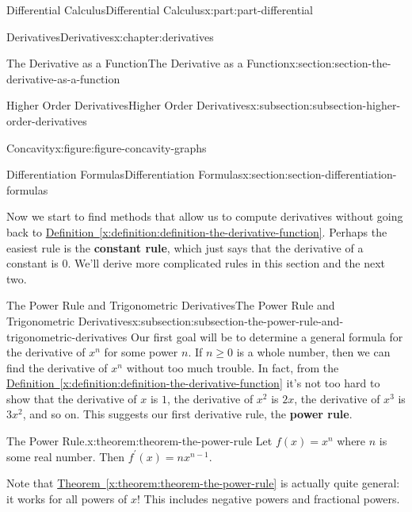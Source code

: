 \documentclass[twoside,10pt,]{book}
\newcommand{\xreffont}{\relax}
\newcommand{\terminology}[1]{\textbf{#1}}
\numberwithin{equation}{part}
\begin{document}
\begin{partptx}{Differential Calculus}{}{Differential Calculus}{}{}{x:part:part-differential}
\begin{chapterptx}{Derivatives}{}{Derivatives}{}{}{x:chapter:derivatives}
\begin{sectionptx}{The Derivative as a Function}{}{The Derivative as a Function}{}{}{x:section:section-the-derivative-as-a-function}
\begin{subsectionptx}{Higher Order Derivatives}{}{Higher Order Derivatives}{}{}{x:subsection:subsection-higher-order-derivatives}
\begin{figureptx}{Concavity}{x:figure:figure-concavity-graphs}{}
\begin{sidebyside}{2}{0}{0}{0}
\begin{sbspanel}{0.5}
\end{sbspanel}%
\end{sidebyside}%
\tcblower
\end{figureptx}%
\end{subsectionptx}
\end{sectionptx}
%
%
\typeout{************************************************}
\typeout{************************************************}
%
\begin{sectionptx}{Differentiation Formulas}{}{Differentiation Formulas}{}{}{x:section:section-differentiation-formulas}
\begin{introduction}{}%
Now we start to find methods that allow us to compute derivatives without going back to \hyperref[x:definition:definition-the-derivative-function]{Definition~{\xreffont\ref{x:definition:definition-the-derivative-function}}}. Perhaps the easiest rule is the \terminology{constant rule}, which just says that the derivative of a constant is \(0\). We'll derive more complicated rules in this section and the next two.%
\end{introduction}%
%
%
\typeout{************************************************}
\typeout{************************************************}
%
\begin{subsectionptx}{The Power Rule and Trigonometric Derivatives}{}{The Power Rule and Trigonometric Derivatives}{}{}{x:subsection:subsection-the-power-rule-and-trigonometric-derivatives}
Our first goal will be to determine a general formula for the derivative of \(x^{n}\) for some power \(n\). If \(n\geq0\) is a whole number, then we can find the derivative of \(x^{n}\) without too much trouble. In fact, from the \hyperref[x:definition:definition-the-derivative-function]{Definition~{\xreffont\ref{x:definition:definition-the-derivative-function}}} it's not too hard to show that the derivative of \(x\) is \(1\), the derivative of \(x^{2}\) is \(2x\), the derivative of \(x^{3}\) is \(3x^{2}\), and so on. This suggests our first derivative rule, the \terminology{power rule}.%
\begin{theorem}{The Power Rule.}{}{x:theorem:theorem-the-power-rule}%
%
Let \(f(x) = x^{n}\) where \(n\) is some real number. Then \(f^{\prime}(x) = nx^{n-1}\).%
\end{theorem}
Note that \hyperref[x:theorem:theorem-the-power-rule]{Theorem~{\xreffont\ref{x:theorem:theorem-the-power-rule}}} is actually quite general: it works for all powers of \(x\)! This includes negative powers and fractional powers.%

\end{subsectionptx}
\end{sectionptx}
\end{chapterptx}
\end{partptx}
\end{document}
